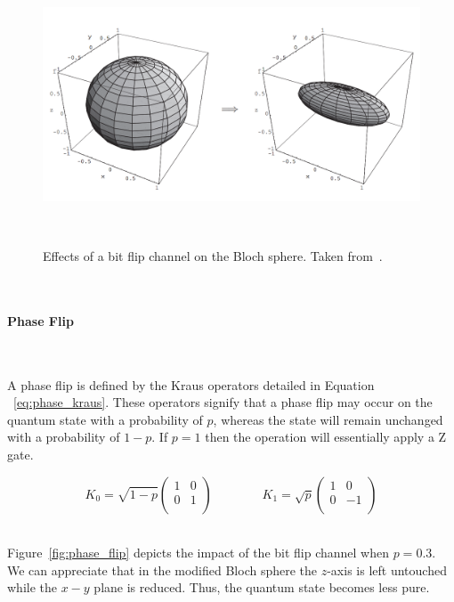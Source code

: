 \begin{figure}[h!]
  \includegraphics[scale=0.39]{figures/bit_flip.png}
  \centering
  \caption{Effects of a bit flip channel on the Bloch sphere. Taken from~\cite{nielsen_quantum_2010}.}
~\label{fig:bit_flip}
\end{figure} \

\paragraph{Phase Flip} \

A phase flip is defined by the Kraus operators detailed in Equation
~\ref{eq:phase_kraus}. These operators signify that a phase flip
may occur on the quantum state with a probability of \(p\), whereas
the state will remain unchanged with a probability of \(1-p\). If
\(p=1\) then the operation will essentially apply a Z gate. \

\begin{equation}\label{eq:phase_kraus}
  K_0 = \sqrt{1-p} \begin{pmatrix}
          1 & 0 \\
          0 & 1 \\
        \end{pmatrix} \qquad \qquad
  K_1 = \sqrt{p} \begin{pmatrix}
          1 & 0 \\
          0 & -1 \\
        \end{pmatrix}
\end{equation} \

Figure~\ref{fig:phase_flip} depicts the impact of the bit flip
channel when \(p=0.3\). We can appreciate that in the modified
Bloch sphere the \(z\)-axis is left untouched while the \(x-y\)
plane is reduced. Thus, the quantum state becomes less pure. \


